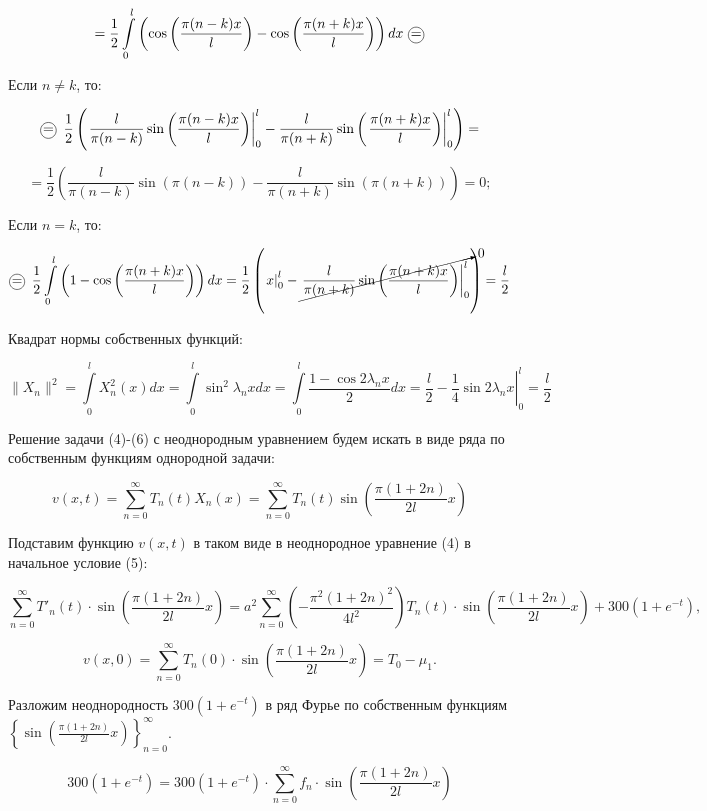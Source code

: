 $$ = \frac{1}{2}\int\limits_0^l \left( \cos \left( \frac{\pi(n - k)x}{l} \right) - \cos \left( \frac{\pi(n + k)x}{l} \right)\right)dx\,\, \circled{=}$$

Если $n\neq k$, то:

$$\circled{=} \,\,\,\frac{1}{2} \left( \left. \frac{l}{\pi (n - k)} \sin \left( \frac{\pi (n - k)x}{l} \right) \right|_0^l - \frac{l}{\pi (n + k)} \sin \left( \left. \frac{\pi (n + k) x}{l} \right) \right|_0^l \right)=$$

$$ = \frac{1}{2} \left( \frac{l}{\pi (n - k)} \sin{(\pi (n - k))} - \frac{l}{\pi (n + k)} \sin{(\pi (n + k))} \right) = 0;$$

Если $n=k$, то:

$$\circled{=} \,\,\,\frac{1}{2}\int\limits_0^l \left( 1 - \cos \left( \frac{\pi(n + k)x}{l} \right) \right)dx = \frac{1}{2} \left( \left. x \right|_0^l - \cancelto{0}{\left. \frac{l}{\pi (n + k)} \sin \left( \frac{\pi (n + k)x}{l} \right) \right|_0^l} \right) = \frac{l}{2} $$

Квадрат нормы собственных функций:

$$\|X_{n}\|^{2} = \int\limits_0^l X_{n}^{2}(x)dx = \int\limits_0^l \sin^{2}{\lambda_{n}x}dx = \int\limits_0^l \frac{1 - \cos{2\lambda_{n}x}}{2}dx = \frac{l}{2} - \left. \frac{1}{4} \sin{2\lambda_{n}x}\right|_0^l = \frac{l}{2} $$

Решение задачи (4)-(6) с неоднородным уравнением будем искать в виде ряда по собственным функциям однородной задачи:

$$v(x, t) = \sum_{n=0}^{\infty}T_{n}(t)X_{n}(x) = \sum_{n=0}^{\infty}T_{n}(t)\sin \left( \frac{\pi (1 + 2n)}{2l}x \right)$$

Подставим функцию $v(x, t)$ в таком виде в неоднородное уравнение (4) в начальное условие (5):

$$\sum_{n=0}^{\infty}T'_{n}(t)\cdot \sin \left( \frac{\pi (1 + 2n)}{2l}x \right) = a^{2}\sum_{n=0}^{\infty} \left( -\frac{\pi^{2}(1 + 2n)^{2}}{4l^{2}} \right) T_{n}(t)\cdot \sin \left( \frac{\pi(1 + 2n)}{2l}x \right) + 300(1 + e^{-t}),$$

$$v(x, 0) = \sum_{n=0}^{\infty}T_{n}(0) \cdot \sin \left( \frac{\pi (1 + 2n)}{2l}x \right) = T_{0} - \mu_{1}.$$

Разложим неоднородность $300(1+e^{-t})$ в ряд Фурье по собственным \linebreak функциям $\left\{ \sin \left( \frac{\pi (1 + 2n)}{2l}x \right)  \right\}_{n=0}^{\infty}$.

$$300(1 + e^{-t}) = 300(1 + e^{-t}) \cdot \sum_{n=0}^{\infty} f_{n} \cdot \sin \left( \frac{\pi (1 + 2n)}{2l}x \right)$$

